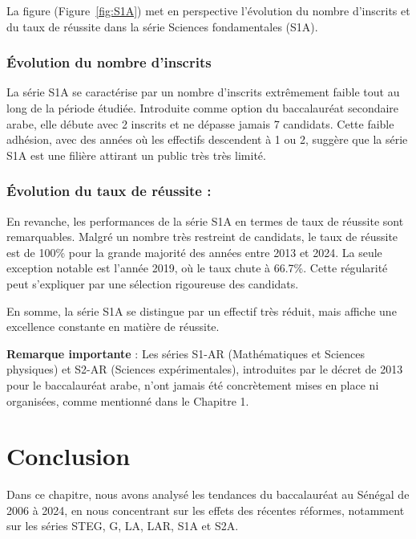 La figure (Figure~\ref{fig:S1A}) met en perspective l'évolution du nombre d'inscrits et du taux de réussite dans la série Sciences fondamentales (S1A).

\subsubsection{Évolution du nombre d'inscrits}

La série S1A se caractérise par un nombre d'inscrits extrêmement faible tout au long de la période étudiée. Introduite comme option du baccalauréat secondaire arabe, elle débute avec 2 inscrits et ne dépasse jamais 7 candidats. 
Cette faible adhésion, avec des années où les effectifs descendent à 1 ou 2, suggère que la série S1A est une filière attirant un public très très limité.

\subsubsection{Évolution du taux de réussite :}

En revanche, les performances de la série S1A en termes de taux de réussite sont remarquables. 
Malgré un nombre très restreint de candidats, le taux de réussite est de 100\% pour la grande majorité des années entre 2013 et 2024. 
La seule exception notable est l'année 2019, où le taux chute à 66.7\%. 
Cette régularité peut s’expliquer par une sélection rigoureuse des candidats.

\bigskip

En somme, la série S1A se distingue par un effectif très réduit, mais affiche une excellence constante en matière de réussite. 

\textbf{Remarque importante} : Les séries S1-AR (Mathématiques et Sciences physiques) et S2-AR (Sciences expérimentales), introduites par le décret de 2013 pour le baccalauréat arabe, n'ont jamais été concrètement mises en place ni organisées, comme mentionné dans le Chapitre 1.

\section{Conclusion}

Dans ce chapitre, nous avons analysé les tendances du baccalauréat au Sénégal de 2006 à 2024, en nous concentrant sur les effets des récentes réformes, notamment sur les séries STEG, G, LA, LAR, S1A et S2A.


